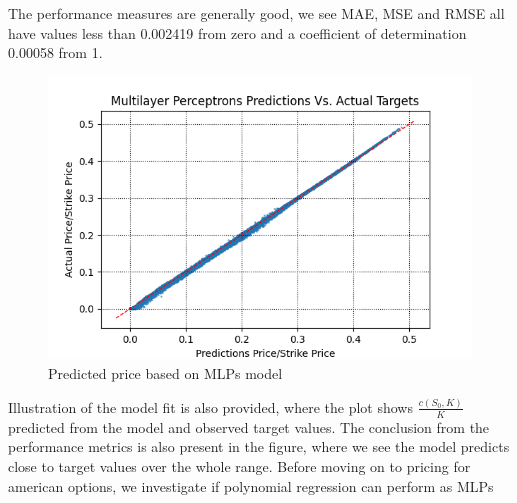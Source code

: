 The performance measures are generally good, we see MAE, MSE and RMSE all have values less than 0.002419 from zero and a coefficient of determination 0.00058 from 1. 

\begin{figure}[th]
\centering
\includegraphics{Figures/PredictionEuroC.png}
\decoRule
\caption[MLPs Predictions Vs. Actual Prices]{Predicted price based on MLPs model}
\label{fig:MLPsEuroC}
\end{figure}

Illustration of the model fit is also provided, where the plot shows $\frac{c(S_0,K)}{K}$ predicted from the model and observed target values. The conclusion from the performance metrics is also present in the figure, where we see the model predicts close to target values over the whole range. Before moving on to pricing for american options, we investigate if polynomial regression can perform as MLPs

